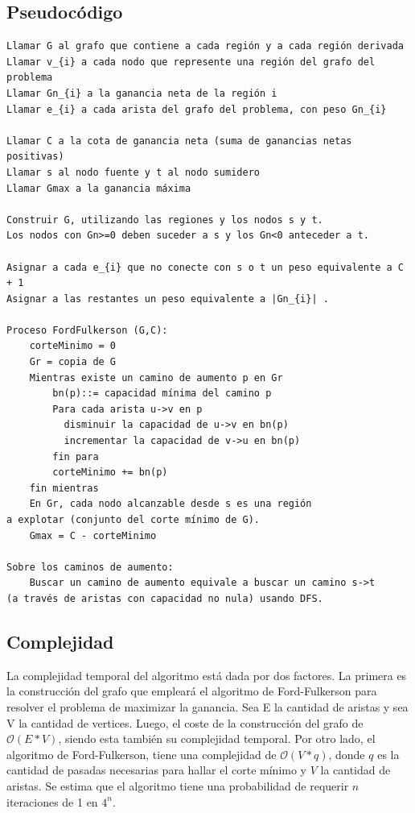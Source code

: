 \newpage
\subsection{Pseudocódigo}

\begin{verbatim}
Llamar G al grafo que contiene a cada región y a cada región derivada
Llamar v_{i} a cada nodo que represente una región del grafo del problema
Llamar Gn_{i} a la ganancia neta de la región i
Llamar e_{i} a cada arista del grafo del problema, con peso Gn_{i}

Llamar C a la cota de ganancia neta (suma de ganancias netas positivas)
Llamar s al nodo fuente y t al nodo sumidero
Llamar Gmax a la ganancia máxima
    
Construir G, utilizando las regiones y los nodos s y t. 
Los nodos con Gn>=0 deben suceder a s y los Gn<0 anteceder a t.

Asignar a cada e_{i} que no conecte con s o t un peso equivalente a C + 1
Asignar a las restantes un peso equivalente a |Gn_{i}| .
    
Proceso FordFulkerson (G,C):
    corteMinimo = 0
    Gr = copia de G
    Mientras existe un camino de aumento p en Gr
        bn(p)::= capacidad mínima del camino p
        Para cada arista u->v en p
          disminuir la capacidad de u->v en bn(p)
          incrementar la capacidad de v->u en bn(p)
        fin para
        corteMinimo += bn(p)
    fin mientras
    En Gr, cada nodo alcanzable desde s es una región
a explotar (conjunto del corte mínimo de G).
    Gmax = C - corteMinimo

Sobre los caminos de aumento:
    Buscar un camino de aumento equivale a buscar un camino s->t 
(a través de aristas con capacidad no nula) usando DFS.
\end{verbatim}


\newpage
\subsection{Complejidad}
La complejidad temporal del algoritmo está dada por dos factores. La primera es la construcción del grafo que empleará el algoritmo de Ford-Fulkerson para resolver el problema de maximizar la ganancia.
Sea E la cantidad de aristas y sea V la cantidad de vertices. Luego, el coste de la construcción del grafo de $\mathcal{O}(E*V)$, siendo esta también su complejidad temporal.
Por otro lado, el algoritmo de Ford-Fulkerson, tiene una complejidad de $\mathcal{O}(V*q)$, donde $q$ es la cantidad de pasadas necesarias para hallar el corte mínimo y $V$ la cantidad de aristas. Se estima que el algoritmo tiene una probabilidad de requerir $n$ iteraciones de 1 en $4^n$.

